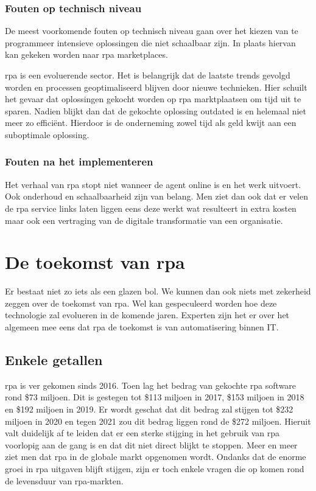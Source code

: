 \subsubsection{Fouten op technisch niveau}
De meest voorkomende fouten op technisch niveau gaan over het kiezen van te programmeer intensieve oplossingen die niet schaalbaar zijn. In plaats hiervan kan gekeken worden naar \acrshort{rpa} marketplaces. \autocite{pitfallsRPA}

\acrshort{rpa} is een evoluerende sector. Het is belangrijk dat de laatste trends gevolgd worden en processen geoptimaliseerd blijven door nieuwe technieken. Hier schuilt het gevaar dat oplossingen gekocht worden op \acrshort{rpa} marktplaatsen om tijd uit te sparen. Nadien blijkt dan dat de gekochte oplossing outdated is en helemaal niet meer zo efficiënt. Hierdoor is de onderneming zowel tijd als geld kwijt aan een suboptimale oplossing. \autocite{pitfallsRPA}

\subsubsection{Fouten na het implementeren}
Het verhaal van \acrshort{rpa} stopt niet wanneer de agent online is en het werk uitvoert. Ook onderhoud en schaalbaarheid zijn van belang. Men ziet dan ook dat er velen de \acrshort{rpa} service links laten liggen eens deze werkt wat resulteert in extra kosten maar ook een vertraging van de digitale transformatie van een organisatie. \autocite{pitfallsRPA}

\section{De toekomst van \acrshort{rpa}}
Er bestaat niet zo iets als een glazen bol. We kunnen dan ook niets met zekerheid zeggen over de toekomst van \acrshort{rpa}. Wel kan gespeculeerd worden hoe deze technologie zal evolueren in de komende jaren. Experten zijn het er over het algemeen mee eens dat \acrshort{rpa} de toekomst is van automatisering binnen IT. \autocite{futRPA}

\subsection{Enkele getallen}
\acrshort{rpa} is ver gekomen sinds 2016. Toen lag het bedrag van gekochte \acrshort{rpa} software rond \$73 miljoen. Dit is gestegen tot \$113 miljoen in 2017, \$153 miljoen in 2018 en \$192 miljoen in 2019. Er wordt geschat dat dit bedrag zal stijgen tot \$232 miljoen in 2020 en tegen 2021 zou dit bedrag liggen rond de \$272 miljoen. Hieruit valt duidelijk af te leiden dat er een sterke stijging in het gebruik van \acrshort{rpa} voorlopig aan de gang is en dat dit niet direct blijkt te stoppen. Meer en meer ziet men dat \acrshort{rpa} in de globale markt opgenomen wordt. \autocite{futRPA} Ondanks dat de enorme groei in \acrshort{rpa} uitgaven blijft stijgen, zijn er toch enkele vragen die op komen rond de levensduur van \acrshort{rpa}-markten. \autocite{everythingRPA}

